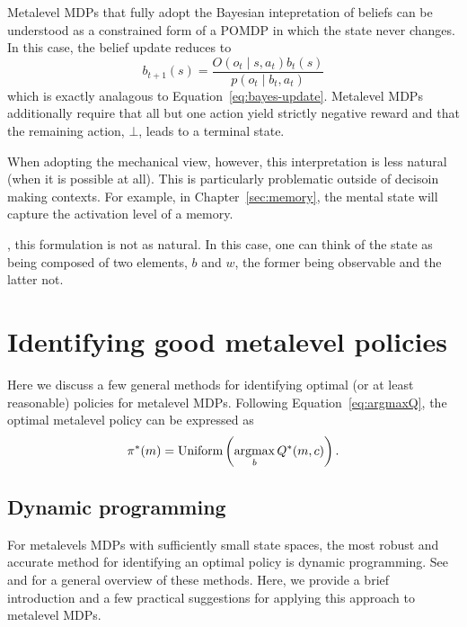 Metalevel MDPs that fully adopt the Bayesian intepretation of beliefs can be understood as a constrained form of a POMDP in which the state never changes. In this case, the belief update reduces to
\begin{equation}\label{eq:pomdp-update}
  b_{t+1}(s) =  
  \frac{O(o_t \mid s, a_t) b_t(s)}{p(o_t \mid b_t, a_t)}
\end{equation}
which is exactly analagous to Equation~\ref{eq:bayes-update}.
Metalevel MDPs additionally require that all but one action yield strictly negative reward and that the remaining action, $\bot$, leads to a terminal state.

When adopting the mechanical view, however, this interpretation is less natural (when it is possible at all). This is particularly problematic outside of decisoin making contexts. For example, in Chapter~\ref{sec:memory}, the mental state will capture the activation level of a memory. 

, this formulation is not as natural. In this case, one can think of the state as being composed of two elements, $b$ and $w$, the former being observable and the latter not.


\section{Identifying good metalevel policies}\label{sec:computing}

Here we discuss a few general methods for identifying optimal (or at least reasonable) policies for metalevel MDPs. Following Equation~\ref{eq:argmaxQ}, the optimal metalevel policy can be expressed as
%
\begin{equation}
  \pi^*(m) = \text{Uniform}\left(\operatorname*{argmax}_b Q^*(m, c)\right).
\end{equation}


\subsection{Dynamic programming}\label{sec:backinduct}

For metalevels MDPs with sufficiently small state spaces, the most robust and accurate method for identifying an optimal policy is dynamic programming. See \citet{sutton2018reinforcement} and \citet{puterman2014markov} for a general overview of these methods. Here, we provide a brief introduction and a few practical suggestions for applying this approach to metalevel MDPs.

